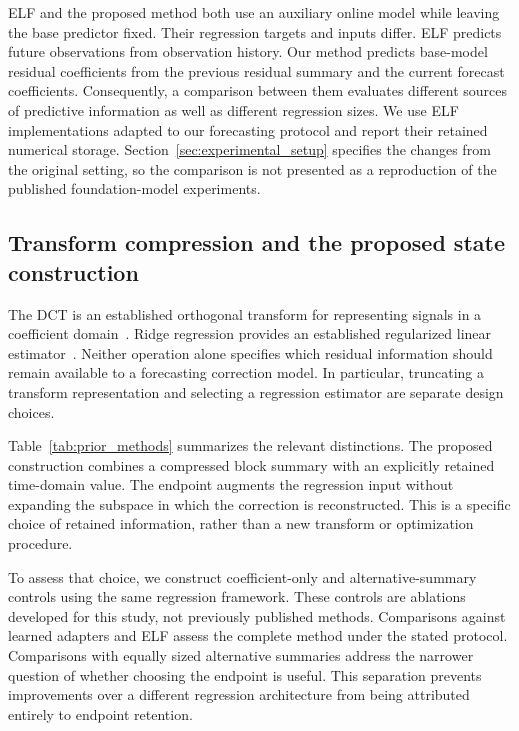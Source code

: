 ELF and the proposed method both use an auxiliary online model while leaving the base predictor fixed. Their regression targets and inputs differ. ELF predicts future observations from observation history. Our method predicts base-model residual coefficients from the previous residual summary and the current forecast coefficients. Consequently, a comparison between them evaluates different sources of predictive information as well as different regression sizes. We use ELF implementations adapted to our forecasting protocol and report their retained numerical storage. Section~\ref{sec:experimental_setup} specifies the changes from the original setting, so the comparison is not presented as a reproduction of the published foundation-model experiments.

\subsection{Transform compression and the proposed state construction}
The DCT is an established orthogonal transform for representing signals in a coefficient domain~\cite{ahmed1974dct}. Ridge regression provides an established regularized linear estimator~\cite{hoerl1970ridge}. Neither operation alone specifies which residual information should remain available to a forecasting correction model. In particular, truncating a transform representation and selecting a regression estimator are separate design choices.

Table~\ref{tab:prior_methods} summarizes the relevant distinctions. The proposed construction combines a compressed block summary with an explicitly retained time-domain value. The endpoint augments the regression input without expanding the subspace in which the correction is reconstructed. This is a specific choice of retained information, rather than a new transform or optimization procedure.

To assess that choice, we construct coefficient-only and alternative-summary controls using the same regression framework. These controls are ablations developed for this study, not previously published methods. Comparisons against learned adapters and ELF assess the complete method under the stated protocol. Comparisons with equally sized alternative summaries address the narrower question of whether choosing the endpoint is useful. This separation prevents improvements over a different regression architecture from being attributed entirely to endpoint retention.

\begin{table}[t]
\caption{Representations and estimation procedures of related methods. The final column identifies their role in this study. Adapted comparisons use the protocol specified in Section~\ref{sec:experimental_setup}.}
\label{tab:prior_methods}
\centering

\end{table}
